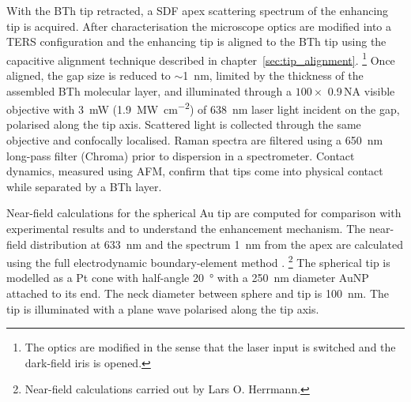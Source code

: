 \documentclass{article}
\begin{document}
With the BTh tip retracted, a SDF apex scattering spectrum of the enhancing tip is acquired. After characterisation the microscope optics are modified into a TERS configuration and the enhancing tip is aligned to the BTh tip using the capacitive alignment technique described in chapter~\ref{sec:tip_alignment}.%
\footnote{The optics are modified in the sense that the laser input is switched and the dark-field iris is opened.}
Once aligned, the gap size is reduced to  $\sim$\SI{1}{nm}, limited by the thickness of the assembled BTh molecular layer, and illuminated through a $100\times$ 0.9\,NA visible objective with \SI{3}{mW} (\SI{1.9}{\mega\watt\per\centi\metre\squared}) of \SI{638}{nm} laser light incident on the gap,  polarised along the tip axis. Scattered light is collected through the same objective and confocally localised. Raman spectra are filtered using a \SI{650}{nm} long-pass filter (Chroma) prior to dispersion in a spectrometer. Contact dynamics, measured using AFM, confirm that tips come into physical contact while separated by a BTh layer.

Near-field calculations for the spherical Au tip are computed for comparison with experimental results and to understand the enhancement mechanism. The near-field distribution at \SI{633}{nm} and the spectrum \SI{1}{nm} from the apex are calculated using the full electrodynamic boundary-element method \cite{deabajo1997, deabajo2002}.%
\footnote{Near-field calculations carried out by Lars O. Herrmann.}
The spherical tip is modelled as a Pt cone with half-angle \SI{20}{\degree} with a \SI{250}{nm} diameter AuNP attached to its end. The neck diameter between sphere and tip is \SI{100}{nm}. The tip is illuminated with a plane wave polarised along the tip axis.
\end{document}
